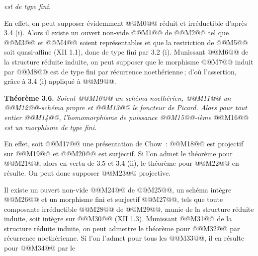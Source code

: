 
\emph{est de type fini.}

En effet, on peut supposer \'evidemment @@M0@@ r\'eduit et irr\'eductible d'apr\`es 3.4 (i). Alors il existe un ouvert non-vide @@M1@@ de @@M2@@ tel que @@M3@@ et @@M4@@ soient repr\'esentables et que la restriction de @@M5@@ soit quasi-affine (XII 1.1), donc de type fini par 3.2 (i). Munissant @@M6@@ de la structure r\'eduite induite, on peut supposer que le morphisme @@M7@@ induit par @@M8@@ est de type fini par r\'ecurrence noeth\'erienne\,; d'o\`u l'assertion, gr\^ace \`a 3.4 (i) appliqu\'e \`a @@M9@@.

\textbf{Th\'eor\`eme 3.6.} \emph{Soient @@M10@@ un sch\'ema noeth\'erien, @@M11@@ un @@M12@@-sch\'ema propre et @@M13@@ le foncteur de Picard. Alors pour tout entier @@M14@@, l'homomorphisme de puissance @@M15@@-i\`eme}
@@M16@@
\emph{est un morphisme de type fini.}

En effet, soit @@M17@@ une pr\'esentation de Chow~: @@M18@@ est projectif sur @@M19@@ et @@M20@@ est surjectif. Si l'on admet le th\'eor\`eme pour @@M21@@, alors en vertu de 3.5 et 3.4 (ii), le th\'eor\`eme pour @@M22@@ en r\'esulte. On peut donc supposer @@M23@@ projective.

Il existe un ouvert non-vide @@M24@@ de @@M25@@, un sch\'ema int\`egre @@M26@@ et un morphisme fini et surjectif @@M27@@, tels que toute composante irr\'eductible @@M28@@ de @@M29@@, munie de la structure r\'eduite induite, soit int\`egre sur @@M30@@ (XII 1.3). Munissant @@M31@@ de la structure r\'eduite induite, on peut admettre le th\'eor\`eme pour @@M32@@ par r\'ecurrence noeth\'erienne. Si l'on l'admet pour tous les @@M33@@, il en r\'esulte pour @@M34@@ par le
